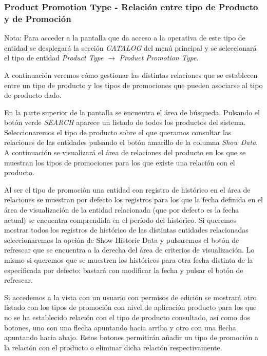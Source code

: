 \subsubsection{Product Promotion Type - Relación entre tipo de Producto y de Promoción}
\label{sub:product-promotion-type-relation}

Nota: Para acceder a la pantalla que da acceso a la operativa de este tipo de entidad se desplegará la sección \emph{CATALOG} del menú principal y se seleccionará el tipo de entidad \emph{Product Type} $\rightarrow$  \emph{Product Promotion Type}.


A continuación veremos cómo gestionar las distintas relaciones que se establecen entre un tipo de producto y los tipos de promociones que pueden asociarse al tipo de producto dado.


En la parte superior de la pantalla se encuentra el área de búsqueda. Pulsando el botón verde \emph{SEARCH} aparece un listado de todos los productos del sistema. Seleccionaremos el tipo de producto sobre el que queramos consultar las relaciones de las entidades pulsando el botón amarillo de la columna \emph{Show Data}. A continuación se visualizará el área de relaciones del producto en los que se muestran los tipos de promociones para los que existe una relación con el producto.

Al ser el tipo de promoción una entidad con registro de histórico en el área de relaciones se muestran por defecto los registros para los que la fecha definida en el área de visualización de la entidad relacionada (que por defecto es la fecha actual) se encuentra comprendida en el período del histórico. Si queremos mostrar todos los registros de histórico de las distintas entidades relacionadas seleccionaremos la opción de Show Historic Data y pulsaremos el botón de refrescar que se encuentra a la derecha del área de criterios de visualización. Lo mismo si queremos que se muestren los históricos para otra fecha distinta de la especificada por defecto: bastará con modificar la fecha y pulsar el botón de refrescar.

Si accedemos a la vista con un usuario con permisos de edición se mostrará otro listado con los tipos de promoción con nivel de aplicación producto para los que no se ha establecido relación con el tipo de producto consultado, así como dos botones, uno con una flecha apuntando hacia arriba y otro con una flecha apuntando hacia abajo. Estos botones permitirán añadir un tipo de promoción a la relación con el producto o eliminar dicha relación respectivamente. 

